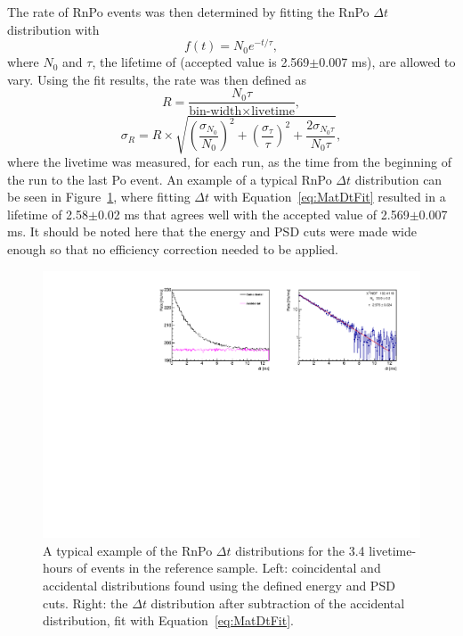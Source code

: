 The rate of RnPo events was then determined by fitting the RnPo $\Delta t$ distribution with
\begin{equation}
	f(t) = N_0e^{-t/\tau},
	\label{eq:MatDtFit}
\end{equation}
where $N_0$ and $\tau$, the lifetime of \Po (accepted value is 2.569$\pm$0.007 ms), are allowed to vary. 
Using the fit results, the rate was then defined as
\begin{equation}
	R = \frac{N_0 \tau}{\textrm{bin-width}\times\textrm{livetime}},
\end{equation}
\begin{equation}
	\sigma_R = R \times \sqrt{  \left(\frac{\sigma_{N_0}}{N_0}\right)^2 + \left(\frac{\sigma_{\tau}}{\tau}\right)^2 + \frac{2\sigma_{N_{0}\tau}}{N_0\tau} },
\end{equation}
where the livetime was measured, for each run, as the time from the beginning of the run to the last Po event. 
An example of a typical RnPo $\Delta t$ distribution can be seen in Figure~\ref{fig:rnpodttimebin23s2}, where fitting $\Delta t$ with Equation~\ref{eq:MatDtFit} resulted in a \Po lifetime of 2.58$\pm$0.02 ms that agrees well with the accepted value of 2.569$\pm$0.007 ms. It should be noted here that the energy and PSD cuts were made wide enough so that no efficiency correction needed to be applied.

\begin{figure}[H]
	\centering
	\includegraphics[width=1.\linewidth]{"tex/6-ac227-images/BNL/RnPoDt_TimeBin23_S2"}
	\caption{A typical example of the RnPo $\Delta t$ distributions for the 3.4 livetime-hours of events in the reference sample. Left: coincidental and accidental distributions found using the defined energy and PSD cuts. Right: the $\Delta t$ distribution after subtraction of the accidental distribution, fit with Equation~\ref{eq:MatDtFit}.}
	\label{fig:rnpodttimebin23s2}
\end{figure}

